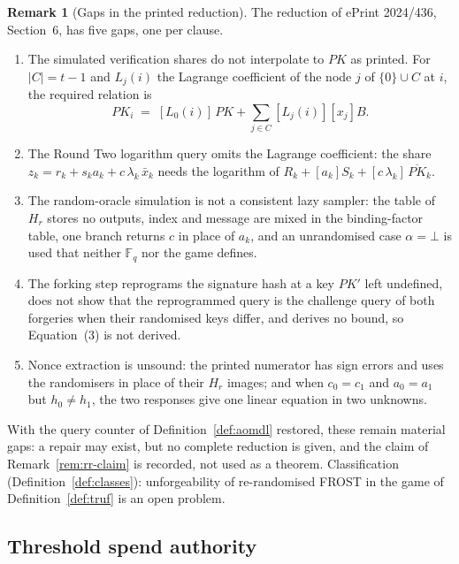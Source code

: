 \documentclass[11pt,a4paper]{article}
\theoremstyle{definition}
\newtheorem{remark}[theorem]{Remark}
\newcommand{\F}{\mathbb{F}}
\newcommand{\Fq}{\F_q}
\begin{document}
\begin{remark}[Gaps in the printed reduction]\label{rem:rr-gaps}
The reduction of ePrint 2024/436, Section~6, has five gaps, one per clause.
\begin{enumerate}
\item[(a)] The simulated verification shares do not interpolate to
  \(\mathit{PK}\) as printed. For \(\lvert C \rvert = t - 1\) and
  \(L_j(i)\) the Lagrange coefficient of the node \(j\) of
  \(\{0\} \cup C\) at \(i\), the required relation is
  \[
    \mathit{PK}_i \;=\; [L_0(i)]\,\mathit{PK}
      + \sum_{j \in C} [L_j(i)][x_j]B .
  \]
\item[(b)] The Round Two logarithm query omits the Lagrange coefficient:
  the share \(z_k = r_k + s_k a_k + c\, \lambda_k\, \bar{x}_k\) needs the
  logarithm of \(R_k + [a_k]S_k + [c\, \lambda_k]\,
  \overline{\mathit{PK}}_k\).
\item[(c)] The random-oracle simulation is not a consistent lazy sampler:
  the table of \(H_r\) stores no outputs, index and message are mixed in the
  binding-factor table, one branch returns \(c\) in place of \(a_k\), and an
  unrandomised case \(\alpha = \bot\) is used that neither \(\Fq\) nor the
  game defines.
\item[(d)] The forking step reprograms the signature hash at a key
  \(\mathit{PK}'\) left undefined, does not show that the reprogrammed query
  is the challenge query of both forgeries when their randomised keys
  differ, and derives no bound, so Equation~(3) is not derived.
\item[(e)] Nonce extraction is unsound: the printed numerator has sign
  errors and uses the randomisers in place of their \(H_r\) images; and when
  \(c_0 = c_1\) and \(a_0 = a_1\) but \(h_0 \ne h_1\), the two responses
  give one linear equation in two unknowns.
\end{enumerate}
With the query counter of Definition~\ref{def:aomdl} restored, these remain
material gaps: a repair may exist, but no complete reduction is given, and
the claim of Remark~\ref{rem:rr-claim} is recorded, not used as a theorem.
Classification (Definition~\ref{def:classes}): unforgeability of
re-randomised FROST in the game of Definition~\ref{def:truf} is an open
problem.
\end{remark}

\subsection{Threshold spend authority}\label{sec:sec-authority}
\end{document}
